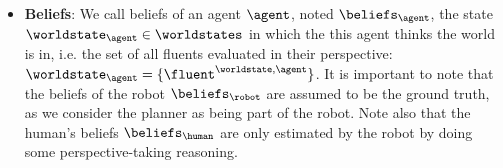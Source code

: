 \begin{itemize}
    \item \textbf{Beliefs}: We call beliefs of an agent $\agent$, noted $\beliefs_\agent$, the state $\worldstate_\agent\in\worldstates$ in which the this agent thinks the world is in, i.e. the set of all fluents evaluated in their perspective: $\worldstate_\agent=\{ \fluent^{\worldstate,\agent} \}$. It is important to note that the beliefs of the robot $\beliefs_\robot$ are assumed to be the ground truth, as we consider the planner as being part of the robot. Note also that the human's beliefs $\beliefs_\human$ are only estimated by the robot by doing some perspective-taking reasoning.
    
    
\end{itemize}